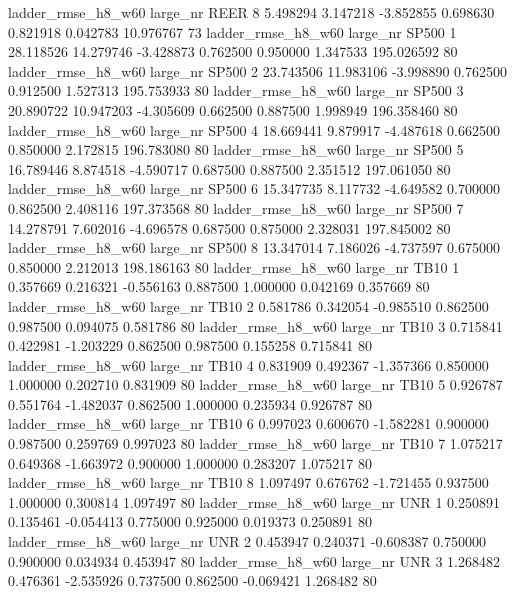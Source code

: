  ladder_rmse_h8_w60   large_nr     REER                 8  5.498294  3.147218  -3.852855 0.698630 0.821918  0.042783   10.976767 73
 ladder_rmse_h8_w60   large_nr    SP500                 1 28.118526 14.279746  -3.428873 0.762500 0.950000  1.347533  195.026592 80
 ladder_rmse_h8_w60   large_nr    SP500                 2 23.743506 11.983106  -3.998890 0.762500 0.912500  1.527313  195.753933 80
 ladder_rmse_h8_w60   large_nr    SP500                 3 20.890722 10.947203  -4.305609 0.662500 0.887500  1.998949  196.358460 80
 ladder_rmse_h8_w60   large_nr    SP500                 4 18.669441  9.879917  -4.487618 0.662500 0.850000  2.172815  196.783080 80
 ladder_rmse_h8_w60   large_nr    SP500                 5 16.789446  8.874518  -4.590717 0.687500 0.887500  2.351512  197.061050 80
 ladder_rmse_h8_w60   large_nr    SP500                 6 15.347735  8.117732  -4.649582 0.700000 0.862500  2.408116  197.373568 80
 ladder_rmse_h8_w60   large_nr    SP500                 7 14.278791  7.602016  -4.696578 0.687500 0.875000  2.328031  197.845002 80
 ladder_rmse_h8_w60   large_nr    SP500                 8 13.347014  7.186026  -4.737597 0.675000 0.850000  2.212013  198.186163 80
 ladder_rmse_h8_w60   large_nr     TB10                 1  0.357669  0.216321  -0.556163 0.887500 1.000000  0.042169    0.357669 80
 ladder_rmse_h8_w60   large_nr     TB10                 2  0.581786  0.342054  -0.985510 0.862500 0.987500  0.094075    0.581786 80
 ladder_rmse_h8_w60   large_nr     TB10                 3  0.715841  0.422981  -1.203229 0.862500 0.987500  0.155258    0.715841 80
 ladder_rmse_h8_w60   large_nr     TB10                 4  0.831909  0.492367  -1.357366 0.850000 1.000000  0.202710    0.831909 80
 ladder_rmse_h8_w60   large_nr     TB10                 5  0.926787  0.551764  -1.482037 0.862500 1.000000  0.235934    0.926787 80
 ladder_rmse_h8_w60   large_nr     TB10                 6  0.997023  0.600670  -1.582281 0.900000 0.987500  0.259769    0.997023 80
 ladder_rmse_h8_w60   large_nr     TB10                 7  1.075217  0.649368  -1.663972 0.900000 1.000000  0.283207    1.075217 80
 ladder_rmse_h8_w60   large_nr     TB10                 8  1.097497  0.676762  -1.721455 0.937500 1.000000  0.300814    1.097497 80
 ladder_rmse_h8_w60   large_nr      UNR                 1  0.250891  0.135461  -0.054413 0.775000 0.925000  0.019373    0.250891 80
 ladder_rmse_h8_w60   large_nr      UNR                 2  0.453947  0.240371  -0.608387 0.750000 0.900000  0.034934    0.453947 80
 ladder_rmse_h8_w60   large_nr      UNR                 3  1.268482  0.476361  -2.535926 0.737500 0.862500 -0.069421    1.268482 80
